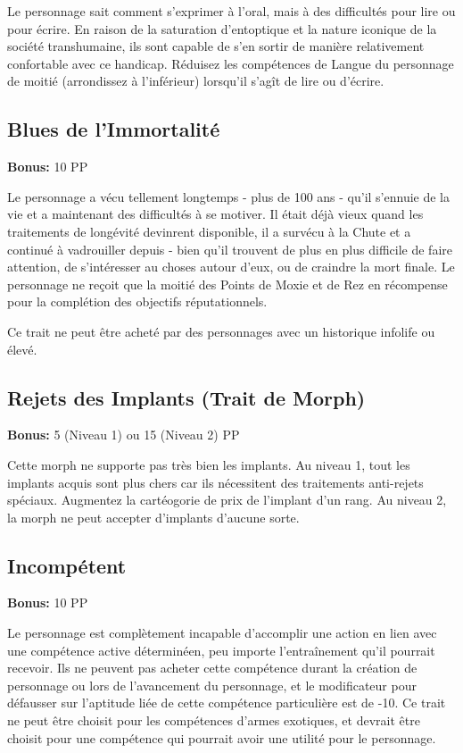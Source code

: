 Le personnage sait comment s'exprimer à l'oral, mais à des difficultés pour lire ou pour écrire. En raison de la saturation d'entoptique et la nature iconique de la société transhumaine, ils sont capable de s'en sortir de manière relativement confortable avec ce handicap. Réduisez les compétences de Langue du personnage de moitié (arrondissez à l'inférieur) lorsqu'il s'agît de lire ou d'écrire. 

\subsection{Blues de l'Immortalité} \label{sec:traits-immortality-blues} 

\textbf{Bonus:} 10 PP 

Le personnage a vécu tellement longtemps - plus de 100 ans - qu'il s'ennuie de la vie et a maintenant des difficultés à se motiver. Il était déjà vieux quand les traitements de longévité devinrent disponible, il a survécu à la Chute et a continué à vadrouiller depuis - bien qu'il trouvent de plus en plus difficile de faire attention, de s'intéresser au choses autour d'eux, ou de craindre la mort finale. Le personnage ne reçoit que la moitié des Points de Moxie et de Rez en récompense pour la complétion des objectifs réputationnels. 

Ce trait ne peut être acheté par des personnages avec un historique infolife ou élevé. 

\subsection{Rejets des Implants (Trait de Morph)} \label{sec:traits-implant-rejection} 

\textbf{Bonus:} 5 (Niveau 1) ou 15 (Niveau 2) PP 

Cette morph ne supporte pas très bien les implants. Au niveau 1, tout les implants acquis sont plus chers car ils nécessitent des traitements anti-rejets spéciaux. Augmentez la cartéogorie de prix de l'implant d'un rang. Au niveau 2, la morph ne peut accepter d'implants d'aucune sorte. 

\subsection{Incompétent} \label{sec:traits-incompetent} 

\textbf{Bonus:} 10 PP 

Le personnage est complètement incapable d'accomplir une action en lien avec une compétence active déterminéen, peu importe l'entraînement qu'il pourrait recevoir. Ils ne peuvent pas acheter cette compétence durant la création de personnage ou lors de l'avancement du personnage, et le modificateur pour défausser sur l'aptitude liée de cette compétence particulière est de -10. Ce trait ne peut être choisit pour les compétences d'armes exotiques, et devrait être choisit pour une compétence qui pourrait avoir une utilité pour le personnage. 

